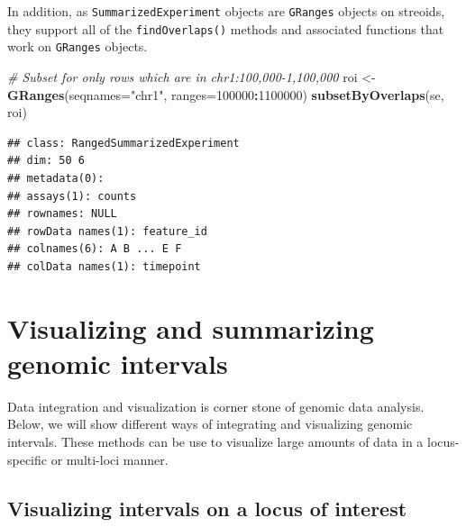 \documentclass[12pt,]{krantz}
\newenvironment{Shaded}{\begin{snugshade}}{\end{snugshade}}
\newcommand{\CommentTok}[1]{\textcolor[rgb]{0.56,0.35,0.01}{\textit{#1}}}
\newcommand{\DataTypeTok}[1]{\textcolor[rgb]{0.13,0.29,0.53}{#1}}
\newcommand{\DecValTok}[1]{\textcolor[rgb]{0.00,0.00,0.81}{#1}}
\newcommand{\KeywordTok}[1]{\textcolor[rgb]{0.13,0.29,0.53}{\textbf{#1}}}
\newcommand{\NormalTok}[1]{#1}
\newcommand{\OperatorTok}[1]{\textcolor[rgb]{0.81,0.36,0.00}{\textbf{#1}}}
\newcommand{\StringTok}[1]{\textcolor[rgb]{0.31,0.60,0.02}{#1}}
\begin{document}
\begin{Shaded}
\end{Shaded}

In addition, as \texttt{SummarizedExperiment} objects are \texttt{GRanges} objects on streoids,
they support all of the \texttt{findOverlaps()} methods and associated functions that
work on \texttt{GRanges} objects.

\begin{Shaded}
\begin{Highlighting}[]
\CommentTok{# Subset for only rows which are in chr1:100,000-1,100,000 }
\NormalTok{roi <-}\StringTok{ }\KeywordTok{GRanges}\NormalTok{(}\DataTypeTok{seqnames=}\StringTok{"chr1"}\NormalTok{, }\DataTypeTok{ranges=}\DecValTok{100000}\OperatorTok{:}\DecValTok{1100000}\NormalTok{)}
\KeywordTok{subsetByOverlaps}\NormalTok{(se, roi)}
\end{Highlighting}
\end{Shaded}

\begin{verbatim}
## class: RangedSummarizedExperiment 
## dim: 50 6 
## metadata(0):
## assays(1): counts
## rownames: NULL
## rowData names(1): feature_id
## colnames(6): A B ... E F
## colData names(1): timepoint
\end{verbatim}

\hypertarget{visualizing-and-summarizing-genomic-intervals}{%
\section{Visualizing and summarizing genomic intervals}\label{visualizing-and-summarizing-genomic-intervals}}

Data integration and visualization is corner stone of genomic data analysis. Below, we will
show different ways of integrating and visualizing genomic intervals. These methods
can be use to visualize large amounts of data in a locus-specific or multi-loci
manner.

\hypertarget{visualizing-intervals-on-a-locus-of-interest}{%
\subsection{Visualizing intervals on a locus of interest}\label{visualizing-intervals-on-a-locus-of-interest}}
\end{document}
